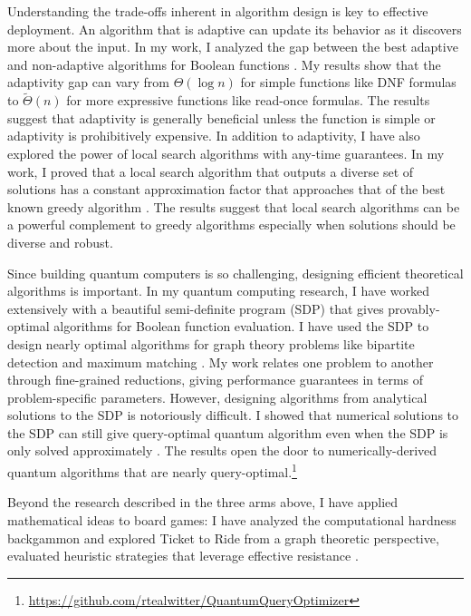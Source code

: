 \documentclass[11pt]{article}
\begin{document}
Understanding the trade-offs inherent in algorithm design is key to effective deployment.
An algorithm that is adaptive can update its behavior as it discovers more about the input.
In my work, I analyzed the gap between the best adaptive and non-adaptive algorithms for Boolean functions \cite{hellerstein2022adaptivity}.
My results show that the adaptivity gap can vary from $\Theta(\log n)$ for simple functions like DNF formulas to $\tilde{\Theta}(n)$ for more expressive functions like read-once formulas.
The results suggest that adaptivity is generally beneficial unless the function is simple or adaptivity is prohibitively expensive.
In addition to adaptivity, I have also explored the power of local search algorithms with any-time guarantees.
In my work, I proved that a local search algorithm that outputs a diverse set of solutions has a constant approximation factor that approaches that of the best known greedy algorithm \cite{hellerstein2022local}.
The results suggest that local search algorithms can be a powerful complement to greedy algorithms especially when solutions should be diverse and robust.

Since building quantum computers is so challenging, designing efficient theoretical algorithms is important.
In my quantum computing research, I have worked extensively with a beautiful semi-definite program (SDP) that gives provably-optimal algorithms for Boolean function evaluation.
I have used the SDP to design nearly optimal algorithms for graph theory problems like bipartite detection and maximum matching \cite{delorenzo2019applications,kimmel2021query}.
My work relates one problem to another through fine-grained reductions, giving performance guarantees in terms of problem-specific parameters.
However, designing algorithms from analytical solutions to the SDP is notoriously difficult.
I showed that numerical solutions to the SDP can still give query-optimal quantum algorithm even when the SDP is only solved approximately \cite{czekanski2023robust}.
The results open the door to numerically-derived quantum algorithms that are nearly query-optimal.\footnote{\url{https://github.com/rtealwitter/QuantumQueryOptimizer}}

Beyond the research described in the three arms above, I have applied mathematical ideas to board games: I have analyzed the computational hardness backgammon \cite{witter2021backgammon} and explored Ticket to Ride from a graph theoretic perspective, evaluated heuristic strategies that leverage effective resistance \cite{witter2020applications}.
\end{document}
